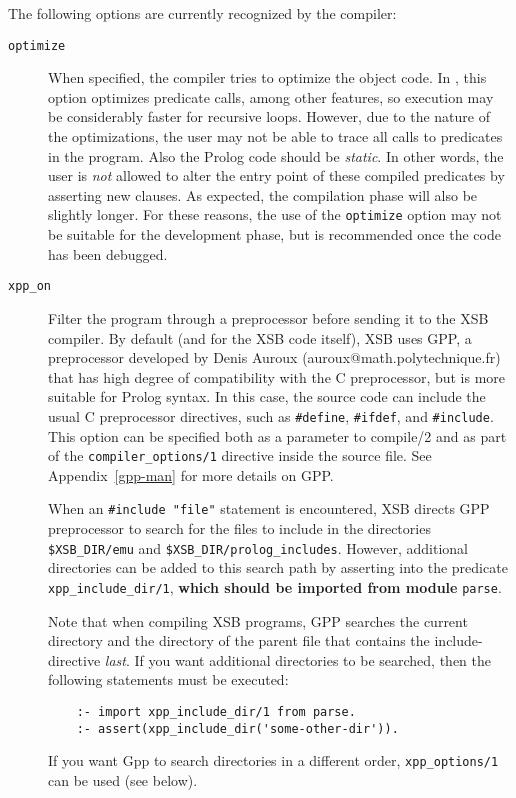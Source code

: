 The following options are currently recognized by the compiler:
\begin{description}
\item[{\tt optimize}]
	When specified, the compiler tries to optimize the object code.
	In \version, this option optimizes predicate calls, among other
	features, so execution may be considerably faster for recursive
	loops.  However,
	due to the nature of the optimizations, the user may not be able to
	trace all calls to predicates in the program.  Also the Prolog code
	should be {\em static}.  In other words, the user is {\em not} allowed
	to alter the entry point of these compiled predicates by asserting new
	clauses.  As expected, the compilation phase will also be slightly
	longer.  For these reasons, the use of the {\tt optimize} option may
	not be suitable for the development phase, but is
	recommended once the code has been debugged.


\item[{\tt xpp\_on}]
  Filter the program through a preprocessor  before sending it to the XSB 
  compiler. By default (and for the XSB code itself), XSB uses GPP, a
  preprocessor developed by Denis Auroux (auroux@math.polytechnique.fr)
  that has high degree of compatibility with the C preprocessor, but is
  more suitable for Prolog syntax. In this case, the source code can
  include the usual C 
  preprocessor directives, such as \verb|#define|, \verb|#ifdef|, and
  \verb|#include|. This option can be specified both as a parameter to
  compile/2 and as part of the {\tt compiler\_options/1} directive inside
  the source file. See Appendix~\ref{gpp-man} for more details on GPP.

  When an \verb|#include "file"| statement is encountered,
  XSB directs GPP preprocessor to search for the files to include in the
  directories \verb|$XSB_DIR/emu| 
  and \verb|$XSB_DIR/prolog_includes|.
  However, additional directories can be added to this search path by
  asserting into the predicate \verb|xpp_include_dir/1|, {\bf which should
    be imported from module} {\tt parse}.
  
  Note that when compiling XSB programs, GPP searches the current directory
  and the directory of the parent file that contains the include-directive
  \emph{last}. If you want additional directories to be searched, then the
  following statements must be executed:
\begin{verbatim}
    :- import xpp_include_dir/1 from parse.
    :- assert(xpp_include_dir('some-other-dir')).
\end{verbatim}
  If you want Gpp to search directories in a different order,
  {\tt xpp\_options/1} can be used (see below).


\end{description}
